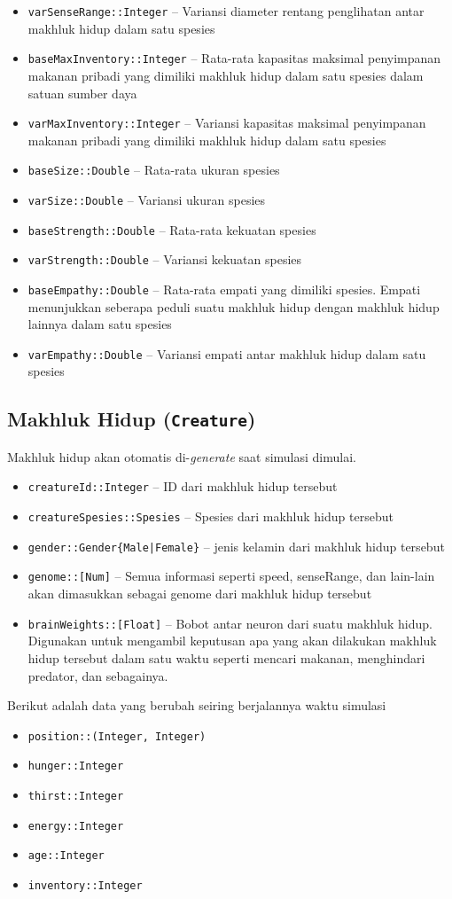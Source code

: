 \documentclass[12pt]{article}
\begin{document}
\begin{itemize}
    \item \texttt{varSenseRange::Integer} -- Variansi diameter rentang penglihatan antar makhluk hidup dalam satu spesies
    \item \texttt{baseMaxInventory::Integer} -- Rata-rata kapasitas maksimal penyimpanan makanan pribadi yang dimiliki makhluk hidup dalam satu spesies dalam satuan sumber daya
    \item \texttt{varMaxInventory::Integer} -- Variansi kapasitas maksimal penyimpanan makanan pribadi yang dimiliki makhluk hidup dalam satu spesies
    \item \texttt{baseSize::Double} -- Rata-rata ukuran spesies
    \item \texttt{varSize::Double} -- Variansi ukuran spesies
    \item \texttt{baseStrength::Double} -- Rata-rata kekuatan spesies
    \item \texttt{varStrength::Double} -- Variansi kekuatan spesies
    \item \texttt{baseEmpathy::Double} -- Rata-rata empati yang dimiliki spesies. Empati menunjukkan seberapa peduli suatu makhluk hidup dengan makhluk hidup lainnya dalam satu spesies
    \item \texttt{varEmpathy::Double} -- Variansi empati antar makhluk hidup dalam satu spesies

\end{itemize}
\subsection{Makhluk Hidup (\texttt{Creature})}
Makhluk hidup akan otomatis di-\textit{generate} saat simulasi dimulai. 
\begin{itemize}
    \item \texttt{creatureId::Integer} -- ID dari makhluk hidup tersebut
    \item \texttt{creatureSpesies::Spesies} -- Spesies dari makhluk hidup tersebut
    \item \texttt{gender::Gender\{Male|Female\}} -- jenis kelamin dari makhluk hidup tersebut
    \item \texttt{genome::[Num]} -- Semua informasi seperti speed, senseRange, dan lain-lain akan dimasukkan sebagai genome dari makhluk hidup tersebut
    \item \texttt{brainWeights::[Float]} -- Bobot antar neuron dari suatu makhluk hidup. Digunakan untuk mengambil keputusan apa yang akan dilakukan makhluk hidup tersebut dalam satu waktu seperti mencari makanan, menghindari predator, dan sebagainya.
\end{itemize}
Berikut adalah data yang berubah seiring berjalannya waktu simulasi
\begin{itemize}
    \item \texttt{position::(Integer, Integer)}
    \item \texttt{hunger::Integer} 
    \item \texttt{thirst::Integer}
    \item \texttt{energy::Integer}
    \item \texttt{age::Integer}
    \item \texttt{inventory::Integer}
\end{itemize}
\end{document}
